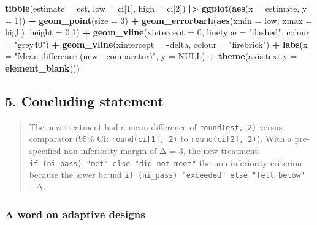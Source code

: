 \documentclass[
]{article}
\newenvironment{Shaded}{\begin{snugshade}}{\end{snugshade}}
\newcommand{\AttributeTok}[1]{\textcolor[rgb]{0.13,0.29,0.53}{#1}}
\newcommand{\ConstantTok}[1]{\textcolor[rgb]{0.56,0.35,0.01}{#1}}
\newcommand{\DecValTok}[1]{\textcolor[rgb]{0.00,0.00,0.81}{#1}}
\newcommand{\FloatTok}[1]{\textcolor[rgb]{0.00,0.00,0.81}{#1}}
\newcommand{\FunctionTok}[1]{\textcolor[rgb]{0.13,0.29,0.53}{\textbf{#1}}}
\newcommand{\NormalTok}[1]{#1}
\newcommand{\SpecialCharTok}[1]{\textcolor[rgb]{0.81,0.36,0.00}{\textbf{#1}}}
\newcommand{\StringTok}[1]{\textcolor[rgb]{0.31,0.60,0.02}{#1}}
\begin{document}
\begin{Shaded}
\begin{Highlighting}[]
\FunctionTok{tibble}\NormalTok{(}\AttributeTok{estimate =}\NormalTok{ est, }\AttributeTok{low =}\NormalTok{ ci[}\DecValTok{1}\NormalTok{], }\AttributeTok{high =}\NormalTok{ ci[}\DecValTok{2}\NormalTok{]) }\SpecialCharTok{|\textgreater{}}
  \FunctionTok{ggplot}\NormalTok{(}\FunctionTok{aes}\NormalTok{(}\AttributeTok{x =}\NormalTok{ estimate, }\AttributeTok{y =} \DecValTok{1}\NormalTok{)) }\SpecialCharTok{+}
  \FunctionTok{geom\_point}\NormalTok{(}\AttributeTok{size =} \DecValTok{3}\NormalTok{) }\SpecialCharTok{+}
  \FunctionTok{geom\_errorbarh}\NormalTok{(}\FunctionTok{aes}\NormalTok{(}\AttributeTok{xmin =}\NormalTok{ low, }\AttributeTok{xmax =}\NormalTok{ high), }\AttributeTok{height =} \FloatTok{0.1}\NormalTok{) }\SpecialCharTok{+}
  \FunctionTok{geom\_vline}\NormalTok{(}\AttributeTok{xintercept =} \DecValTok{0}\NormalTok{, }\AttributeTok{linetype =} \StringTok{"dashed"}\NormalTok{, }\AttributeTok{colour =} \StringTok{"grey40"}\NormalTok{) }\SpecialCharTok{+}
  \FunctionTok{geom\_vline}\NormalTok{(}\AttributeTok{xintercept =} \SpecialCharTok{{-}}\NormalTok{delta, }\AttributeTok{colour =} \StringTok{"firebrick"}\NormalTok{) }\SpecialCharTok{+}
  \FunctionTok{labs}\NormalTok{(}\AttributeTok{x =} \StringTok{"Mean difference (new {-} comparator)"}\NormalTok{, }\AttributeTok{y =} \ConstantTok{NULL}\NormalTok{) }\SpecialCharTok{+}
  \FunctionTok{theme}\NormalTok{(}\AttributeTok{axis.text.y =} \FunctionTok{element\_blank}\NormalTok{())}
\end{Highlighting}
\end{Shaded}

\subsection{5. Concluding statement}\label{concluding-statement}

\begin{quote}
The new treatment had a mean difference of \texttt{round(est,\ 2)}
versus comparator (95\% CI: \texttt{round(ci{[}1{]},\ 2)} to
\texttt{round(ci{[}2{]},\ 2)}). With a pre-specified non-inferiority
margin of Δ = 3, the new treatment
\texttt{if\ (ni\_pass)\ "met"\ else\ "did\ not\ meet"} the
non-inferiority criterion because the lower bound
\texttt{if\ (ni\_pass)\ "exceeded"\ else\ "fell\ below"} −Δ.
\end{quote}

\subsubsection{A word on adaptive
designs}\label{a-word-on-adaptive-designs}
\end{document}
